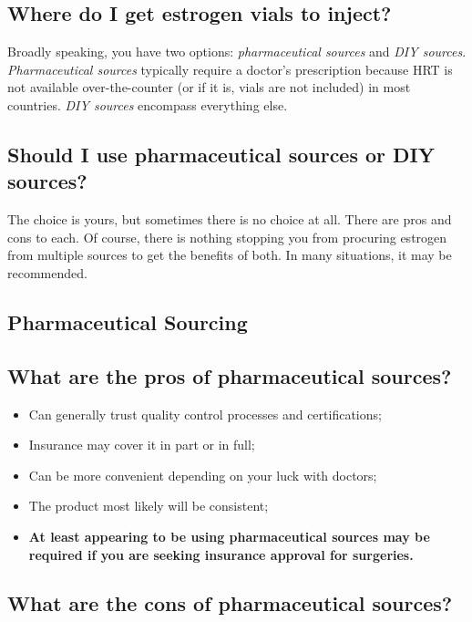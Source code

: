 \documentclass{article}
\begin{document}
\subsection{Where do I get estrogen vials to inject?}

Broadly speaking, you have two options: \textit{pharmaceutical sources} and \textit{DIY sources}. \textit{Pharmaceutical sources} typically require a doctor's prescription because HRT is not available over-the-counter (or if it is, vials are not included) in most countries. \textit{DIY sources} encompass everything else.

\subsection{Should I use pharmaceutical sources or DIY sources?}

The choice is yours, but sometimes there is no choice at all. There are pros and cons to each. Of course, there is nothing stopping you from procuring estrogen from multiple sources to get the benefits of both. In many situations, it may be recommended.

\subsection*{Pharmaceutical Sourcing}

\subsection{What are the pros of pharmaceutical sources?}

\begin{itemize}
  \item Can generally trust quality control processes and certifications;
  \item Insurance may cover it in part or in full;
  \item Can be more convenient depending on your luck with doctors;
  \item The product most likely will be consistent;
  \item \textbf{At least appearing to be using pharmaceutical sources may be required if you are seeking insurance approval for surgeries.}
\end{itemize}

\subsection{What are the cons of pharmaceutical sources?}
\end{document}
